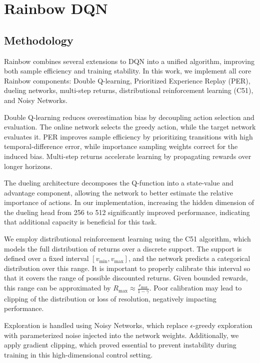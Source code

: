 \section{Rainbow DQN}

\subsection{Methodology}
Rainbow \cite{hessel2018rainbow} combines several extensions to DQN into a unified algorithm, improving both sample efficiency and training stability. In this work, we implement all core Rainbow components: Double Q-learning, Prioritized Experience Replay (PER), dueling networks, multi-step returns, distributional reinforcement learning (C51), and Noisy Networks.

Double Q-learning reduces overestimation bias by decoupling action selection and evaluation. The online network selects the greedy action, while the target network evaluates it. PER improves sample efficiency by prioritizing transitions with high temporal-difference error, while importance sampling weights correct for the induced bias. Multi-step returns accelerate learning by propagating rewards over longer horizons.

The dueling architecture decomposes the Q-function into a state-value and advantage component, allowing the network to better estimate the relative importance of actions. In our implementation, increasing the hidden dimension of the dueling head from 256 to 512 significantly improved performance, indicating that additional capacity is beneficial for this task.

We employ distributional reinforcement learning using the C51 algorithm, which models the full distribution of returns over a discrete support. The support is defined over a fixed interval $[v_{\min}, v_{\max}]$, and the network predicts a categorical distribution over this range. It is important to properly calibrate this interval so that it covers the range of possible discounted returns. Given bounded rewards, this range can be approximated by $R_{\max} \approx \frac{r_{\max}}{1 - \gamma}$. Poor calibration may lead to clipping of the distribution or loss of resolution, negatively impacting performance.

Exploration is handled using Noisy Networks, which replace $\epsilon$-greedy exploration with parameterized noise injected into the network weights. Additionally, we apply gradient clipping, which proved essential to prevent instability during training in this high-dimensional control setting.

